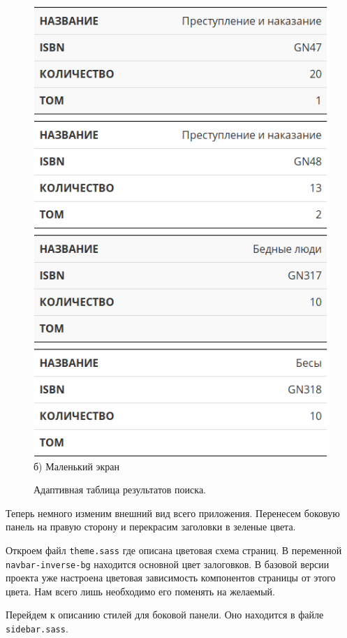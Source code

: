 \begin{figure}[h]
\begin{minipage}[h]{0.49\linewidth}
\includegraphics[scale=0.60]{images/search-result-adaptive.png} \\ б) Маленький экран
\end{minipage}
\caption{Адаптивная таблица результатов поиска.}
\label{ris:adaptive-table}
\end{figure}

Теперь немного изменим внешний вид всего приложения. Перенесем боковую
панель на правую сторону и перекрасим заголовки в зеленые цвета.

Откроем файл \texttt{theme.sass} где описана цветовая схема страниц.
В переменной \texttt{navbar-inverse-bg} находится основной цвет залоговков.
В базовой версии проекта уже настроена цветовая зависимость компонентов
страницы от этого цвета. Нам всего лишь необходимо его поменять на желаемый.

Перейдем к описанию стилей для боковой панели. Оно находится в
файле \texttt{sidebar.sass}.


